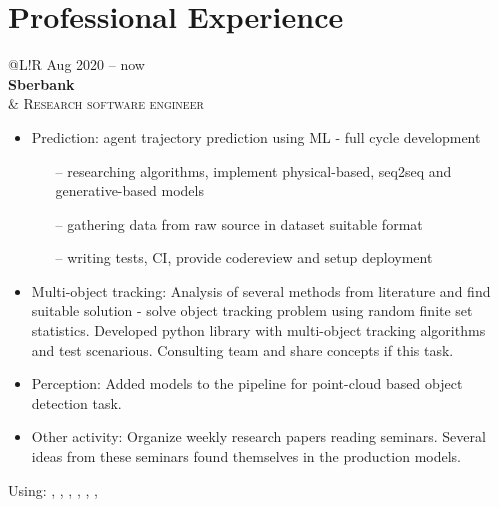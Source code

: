 \section*{Professional Experience}
\begin{tabular}{@{}L!{\VRule}R}
    Aug 2020 -- now                                                                                                       \\ {\bf Sberbank} \\  &
    {\textsc{Research software engineer}}
    \begin{itemize}
        \item Prediction: agent trajectory prediction using ML - full cycle development
        \begin{itemize}
            \item[--] researching algorithms, implement physical-based, seq2seq and generative-based models
            \item[--] gathering data from raw source in dataset suitable format
            \item[--] writing tests, CI, provide codereview and setup deployment 
        \end{itemize}
        \item Multi-object tracking: Analysis of several methods from literature and find suitable solution - solve object tracking problem using random finite set statistics. Developed python library with multi-object tracking algorithms and test scenarious. Consulting team and share concepts if this task.
        \item Perception: Added models to the pipeline for point-cloud based object detection task.
        \item Other activity: Organize weekly research papers reading seminars. Several ideas from these seminars found themselves in the production models.
    \end{itemize}
    Using: , , , , , ,                                                                                        \\
  

\end{tabular}
